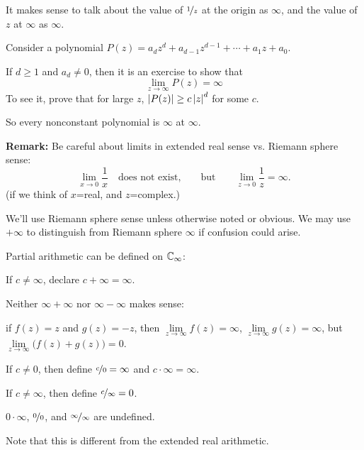 \documentclass[10pt,aspectratio=169]{beamer}
\begin{document}
\begin{frame}
It makes sense to talk about the value of $\nicefrac{1}{z}$ at the origin
as $\infty$, and the value of $z$ at $\infty$ as $\infty$.

\medskip
\pause

Consider a polynomial $P(z) = a_d z^d + a_{d-1} z^{d-1} + \cdots + a_1 z +
a_0$.

\medskip
\pause

If $d \geq 1$ and $a_d \not= 0$, then it is an exercise to show that
\[
\lim_{z \to \infty} P(z) = \infty
\]
\pause
To see it, prove that for large $z$, $\left\lvert {P(z)} \right\rvert \geq c \left\lvert {z} \right\rvert^d$
for some $c$.

\medskip
\pause

So every nonconstant polynomial is $\infty$ at $\infty$.

\medskip
\pause

\textbf{Remark:}
Be careful about limits in extended real sense vs. Riemann sphere sense:
\[
\lim_{x \to 0} \frac{1}{x} \quad \text{does not exist,} \qquad \text{but} \qquad
\lim_{z \to 0} \frac{1}{z} = \infty .
\]
\pause
(if we think of $x$=real, and $z$=complex.)

\medskip
\pause

We'll use Riemann sphere sense unless otherwise noted or obvious.
We may use $+\infty$ to distinguish from Riemann sphere $\infty$
if confusion could arise.
\end{frame}

\begin{frame}
Partial arithmetic can be defined on ${\mathbb{C}}_\infty$:

\medskip
\pause

If $c \not= \infty$, declare $c+\infty = \infty$.

\medskip
\pause

Neither $\infty+\infty$ nor $\infty-\infty$ makes sense:

if $f(z) = z$ and $g(z) = -z$,
then $\lim\limits_{z \to \infty} f(z) = \infty$,
$\lim\limits_{z \to \infty} g(z) = \infty$, but $\lim\limits_{z \to \infty}
\bigl(f(z)+g(z)\bigr) = 0$.

\medskip
\pause

If $c \not= 0$, then define $\nicefrac{c}{0} = \infty$ and $c \cdot \infty =
\infty$.

\medskip
\pause

If $c \not= \infty$, then define $\nicefrac{c}{\infty} = 0$.

\medskip
\pause

$0 \cdot \infty$, $\nicefrac{0}{0}$, and $\nicefrac{\infty}{\infty}$ are undefined.

\medskip
\pause

Note that this is different from the extended real arithmetic.

\end{frame}
\end{document}
